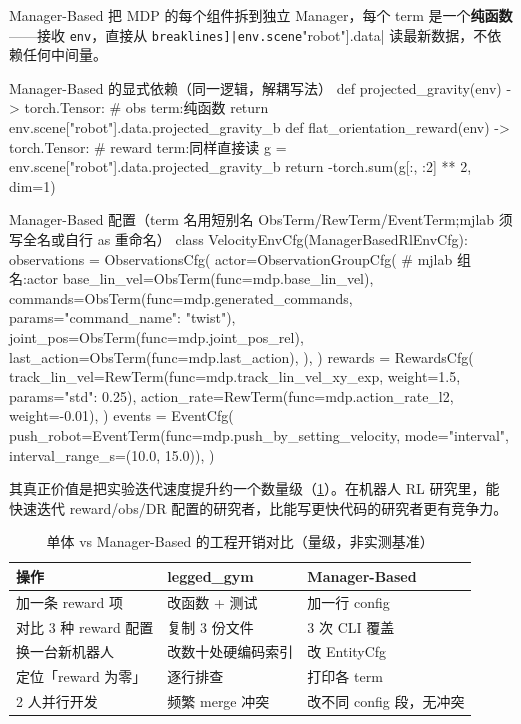 Manager-Based 把 MDP 的每个组件拆到独立 Manager，每个 term 是一个\textbf{纯函数}——接收 \verb|env|，直接从 \Verb[breaklines]|env.scene["robot"].data| 读最新数据，不依赖任何中间量。

\begin{codebox}[Python]{Manager-Based 的显式依赖（同一逻辑，解耦写法）}
def projected_gravity(env) -> torch.Tensor:           # obs term:纯函数
    return env.scene["robot"].data.projected_gravity_b
def flat_orientation_reward(env) -> torch.Tensor:     # reward term:同样直接读
    g = env.scene["robot"].data.projected_gravity_b
    return -torch.sum(g[:, :2] ** 2, dim=1)
\end{codebox}

\begin{codebox}[Python]{Manager-Based 配置（term 名用短别名 ObsTerm/RewTerm/EventTerm;mjlab 须写全名或自行 as 重命名）}
class VelocityEnvCfg(ManagerBasedRlEnvCfg):
    observations = ObservationsCfg(
        actor=ObservationGroupCfg(                    # mjlab 组名:actor
            base_lin_vel=ObsTerm(func=mdp.base_lin_vel),
            commands=ObsTerm(func=mdp.generated_commands,
                             params={"command_name": "twist"}),
            joint_pos=ObsTerm(func=mdp.joint_pos_rel),
            last_action=ObsTerm(func=mdp.last_action),
        ),
    )
    rewards = RewardsCfg(
        track_lin_vel=RewTerm(func=mdp.track_lin_vel_xy_exp, weight=1.5,
                              params={"std": 0.25}),
        action_rate=RewTerm(func=mdp.action_rate_l2, weight=-0.01),
    )
    events = EventCfg(
        push_robot=EventTerm(func=mdp.push_by_setting_velocity,
                             mode="interval", interval_range_s=(10.0, 15.0)),
    )
\end{codebox}

\begin{insight}\label{ins:rlmc-mgr-value}
其真正价值是把实验迭代速度提升约一个数量级（\cref{tab:rlmc-mgr-speedup}）。在机器人 RL 研究里，能快速迭代 reward/obs/DR 配置的研究者，比能写更快代码的研究者更有竞争力。
\end{insight}

\begin{table}[ht]
\centering
\caption{单体 vs Manager-Based 的工程开销对比（量级，非实测基准）}
\label{tab:rlmc-mgr-speedup}
\small
\begin{tabular}{@{}lll@{}}
\toprule
操作 & legged\_gym & Manager-Based \\
\midrule
加一条 reward 项 & 改函数 + 测试 & 加一行 config \\
对比 3 种 reward 配置 & 复制 3 份文件 & 3 次 CLI 覆盖 \\
换一台新机器人 & 改数十处硬编码索引 & 改 EntityCfg \\
定位「reward 为零」 & 逐行排查 & 打印各 term \\
2 人并行开发 & 频繁 merge 冲突 & 改不同 config 段，无冲突 \\
\bottomrule
\end{tabular}
\end{table}

